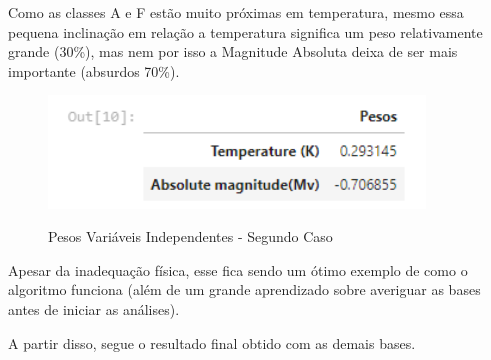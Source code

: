 \documentclass[12pt]{article}
\begin{document}
\clearpage
Como as classes A e F estão muito próximas em temperatura, mesmo essa pequena inclinação em relação a temperatura significa um peso relativamente grande (30\%), mas nem por isso a Magnitude Absoluta deixa de ser mais importante (absurdos 70\%). 

\begin{figure}[h]
\caption{Pesos Variáveis Independentes - Segundo Caso}
\centering
\includegraphics[width=10cm]{out6.png}
\label{figura:out6}
\end{figure}

\hspace{0.4cm}Apesar da inadequação física, esse fica sendo um ótimo exemplo de como o algoritmo funciona (além de um grande aprendizado sobre averiguar as bases antes de iniciar as análises).


\clearpage
\hspace{0.4cm}A partir disso, segue o resultado final obtido com as demais bases. 
\\
\end{document}

